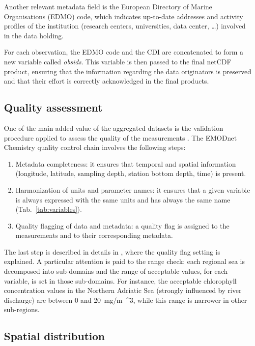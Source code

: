 \documentclass[essd, manuscript]{copernicus}
\begin{document}
Another relevant metadata field is the European Directory of Marine Organisations (EDMO) code, which indicates up-to-date addresses and activity profiles of the institution (research centers, universities, data center, \ldots) involved in the data holding. 

For each observation, the EDMO code and the CDI are concatenated to form a new variable called \textit{obsids}. This variable is then passed to the final netCDF product, ensuring that the information regarding the data originators is preserved and that their effort is correctly acknowledged in the final products. 

\subsection{Quality assessment\label{sec:dataqualitycontrol}}

One of the main added value of the aggregated datasets is the validation procedure applied to assess the quality of the measurements \citep{Barth2015,Lipizer2021,Lipizer2023}. The EMODnet Chemistry quality control chain involves the following steps:
\begin{enumerate}
\item Metadata completeness: it ensures that temporal and spatial information (longitude, latitude, sampling depth, station bottom depth, time) is present.
\item Harmonization of units and parameter names: it ensures that a given variable is always expressed with the same units and has always the same name (Tab.~\ref{tab:variables}). 
\item Quality flagging of data and metadata: a quality flag is assigned to the measurements and to their corresponding metadata.
\end{enumerate} 
The last step is described in details in \citet{Lipizer2023}, where the quality flag setting is explained. A particular attention is paid to the range check: each regional sea is decomposed into sub-domains and the range of acceptable values, for each variable, is set in those sub-domains. For instance, the acceptable chlorophyll concentration values in the Northern Adriatic Sea (strongly influenced by river discharge) are between 0 and 20~\unit{mg/m{^3}}, while this range is narrower in other sub-regions.

\subsection{Spatial distribution}
\end{document}
